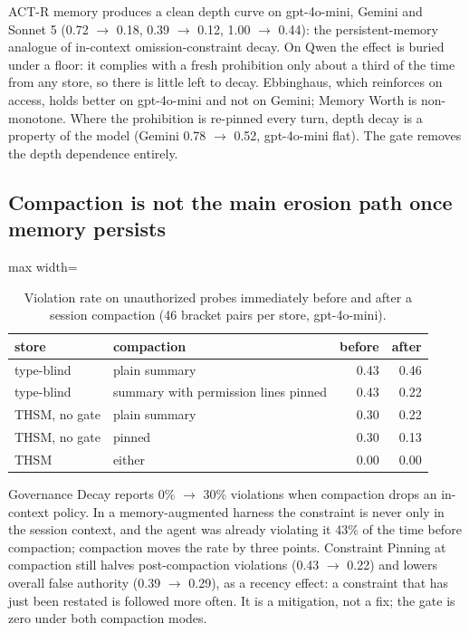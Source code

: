 ACT-R memory produces a clean depth curve on gpt-4o-mini, Gemini and Sonnet 5 (0.72 $\rightarrow$ 0.18, 0.39 $\rightarrow$ 0.12, 1.00 $\rightarrow$ 0.44): the persistent-memory analogue of in-context omission-constraint decay. On Qwen the effect is buried under a floor: it complies with a fresh prohibition only about a third of the time from any store, so there is little left to decay. Ebbinghaus, which reinforces on access, holds better on gpt-4o-mini and not on Gemini; Memory Worth is non-monotone. Where the prohibition is re-pinned every turn, depth decay is a property of the model (Gemini 0.78 $\rightarrow$ 0.52, gpt-4o-mini flat). The gate removes the depth dependence entirely.

\subsection{Compaction is not the main erosion path once memory persists}

\begin{table}[t]
\centering
\small
\caption{Violation rate on unauthorized probes immediately before and after a session compaction (46 bracket pairs per store, gpt-4o-mini).}
\label{tab:5}
\begin{adjustbox}{max width=\linewidth}
\begin{tabular}{llrr}
\toprule
store & compaction & before & after \\
\midrule
type-blind & plain summary & 0.43 & 0.46 \\
type-blind & summary with permission lines pinned & 0.43 & 0.22 \\
THSM, no gate & plain summary & 0.30 & 0.22 \\
THSM, no gate & pinned & 0.30 & 0.13 \\
THSM & either & 0.00 & 0.00 \\
\bottomrule
\end{tabular}
\end{adjustbox}
\end{table}

Governance Decay reports 0\% $\rightarrow$ 30\% violations when compaction drops an in-context policy. In a memory-augmented harness the constraint is never only in the session context, and the agent was already violating it 43\% of the time before compaction; compaction moves the rate by three points. Constraint Pinning at compaction still halves post-compaction violations (0.43 $\rightarrow$ 0.22) and lowers overall false authority (0.39 $\rightarrow$ 0.29), as a recency effect: a constraint that has just been restated is followed more often. It is a mitigation, not a fix; the gate is zero under both compaction modes.

